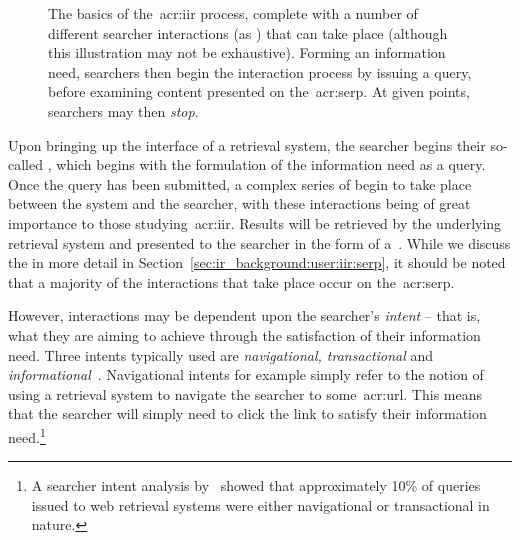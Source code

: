\begin{figure}[t!]
    \centering
    \caption[Basic components and interactions of the~\gls{acr:iir} process]{The basics of the~\gls{acr:iir} process, complete with a number of different searcher interactions (as ) that can take place (although this illustration may not be exhaustive). Forming an information need, searchers then begin the interaction process by issuing a query, before examining content presented on the~\gls{acr:serp}. At given points, searchers may then \emph{stop}.}
    \label{fig:iir}
\end{figure}

Upon bringing up the interface of a retrieval system, the searcher begins their so-called , which begins with the formulation of the information need as a query. Once the query has been submitted, a complex series of  begin to take place between the system and the searcher, with these interactions being of great importance to those studying~\gls{acr:iir}. Results will be retrieved by the underlying retrieval system and presented to the searcher in the form of a~. While we discuss the  in more detail in Section~\ref{sec:ir_background:user:iir:serp}, it should be noted that a majority of the interactions that take place occur on the~\gls{acr:serp}.

However, interactions may be dependent upon the searcher's \emph{intent} -- that is, what they are aiming to achieve through the satisfaction of their information need. Three intents typically used are \emph{navigational, transactional} and \emph{informational}~\citep{jansen2008intents}. Navigational intents for example simply refer to the notion of using a retrieval system to navigate the searcher to some~\gls{acr:url}. This means that the searcher will simply need to click the link to satisfy their information need.\footnote{A searcher intent analysis by~\cite{jansen2008intents} showed that approximately 10\% of queries issued to web retrieval systems were either navigational or transactional in nature.}

